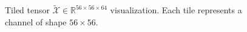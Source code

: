 \documentclass{beamer}
\begin{document}
\begin{frame}
\begin{figure}
\begin{minipage}{.48\textwidth}
			\caption{Tiled tensor $\tilde{\mathcal{X}} \in \mathbb{R}^{56 \times 56 \times 64}$ visualization. Each tile represents a channel of shape $56 \times 56$. }
		\end{minipage}
	\end{figure}
\end{frame}
\end{document}
